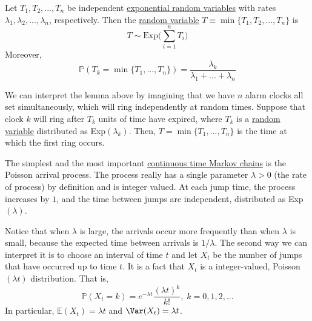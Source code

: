   \begin{lemma}
    \label{thm:minimum-of-independent-exponentials}
    Let $T_1, T_2, ..., T_n$ be independent \hyperref[def:exponential-random-variable]{exponential random variables} with rates $\lambda_1, \lambda_2, ..., \lambda_n$, respectively. Then the \hyperref[def:random-variable]{random variable} $T \equiv \min\{T_1, T_2, ..., T_n\}$ is
    \begin{equation}
      T \sim \text{Exp}\Big(\sum_{i=1}^n T_i\Big)
    \end{equation}
    Moreover, 
    \begin{equation}
      \mathbb{P}(T_k = \min\{T_1, ..., T_n\}) = \frac{\lambda_k}{\lambda_1 + ... + \lambda_n}
    \end{equation}
  \end{lemma}

  We can interpret the lemma above by imagining that we have $n$ alarm clocks all set simultaneously, which will ring independently at random times. Suppose that clock $k$ will ring after $T_k$ units of time have expired, where $T_k$ is a \hyperref[def:random-variable]{random variable} distributed as Exp$(\lambda_k)$. Then, $T = \min\{T_1, ..., T_n\}$ is the time at which the first ring occurs. 

  \begin{example}
    \label{ex:poisson-arrival-process}
    The simplest and the most important \hyperref[def:continuous-time-markov-chain]{continuous time Markov chains} is the Poisson arrival process. The process really has a single parameter $\lambda >0$ (the rate of process) by definition and is integer valued. At each jump time, the process increases by $1$, and the time between jumps are independent, distributed as Exp$(\lambda)$. 

    Notice that when $\lambda$ is large, the arrivals occur more frequently than when $\lambda$ is small, because the expected time between arrivals is $1/\lambda$. The second way we can interpret it is to choose an interval of time $t$ and let $X_t$ be the number of jumps that have occurred up to time $t$. It is a fact that $X_t$ is a integer-valued, Poisson$(\lambda t)$ distribution. That is, 
    \begin{equation}
      \mathbb{P}(X_t = k) = e^{-\lambda t} \frac{(\lambda t)^k}{k!}, \; k = 0, 1, 2, ...
    \end{equation}
    In particular, $\mathbb{E}(X_t) = \lambda t$ and $\Var(X_t) = \lambda t$. 
  \end{example}

